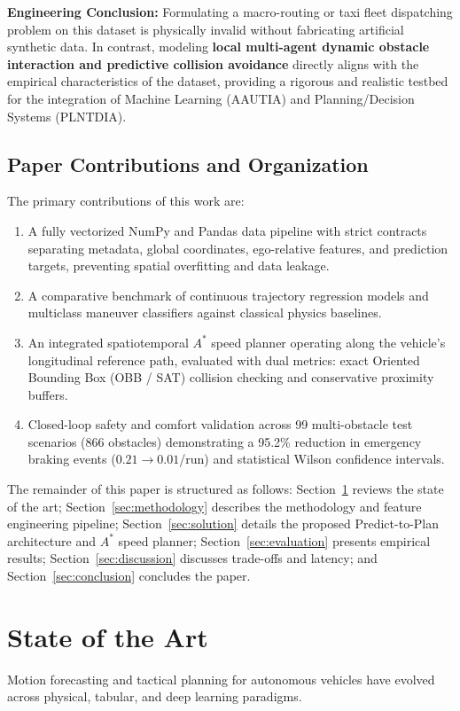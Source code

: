 \documentclass[runningheads]{llncs}
\begin{document}
\noindent \textbf{Engineering Conclusion:} Formulating a macro-routing or taxi fleet dispatching problem on this dataset is physically invalid without fabricating artificial synthetic data. In contrast, modeling \textbf{local multi-agent dynamic obstacle interaction and predictive collision avoidance} directly aligns with the empirical characteristics of the dataset, providing a rigorous and realistic testbed for the integration of Machine Learning (AAUTIA) and Planning/Decision Systems (PLNTDIA).

\subsection{Paper Contributions and Organization}
The primary contributions of this work are:
\begin{enumerate}
    \item A fully vectorized NumPy and Pandas data pipeline with strict contracts separating metadata, global coordinates, ego-relative features, and prediction targets, preventing spatial overfitting and data leakage.
    \item A comparative benchmark of continuous trajectory regression models and multiclass maneuver classifiers against classical physics baselines.
    \item An integrated spatiotemporal $A^*$ speed planner operating along the vehicle's longitudinal reference path, evaluated with dual metrics: exact Oriented Bounding Box (OBB / SAT) collision checking and conservative proximity buffers.
    \item Closed-loop safety and comfort validation across 99 multi-obstacle test scenarios (866 obstacles) demonstrating a 95.2\% reduction in emergency braking events ($0.21 \to 0.01$/run) and statistical Wilson confidence intervals.
\end{enumerate}

The remainder of this paper is structured as follows: Section~\ref{sec:sota} reviews the state of the art; Section~\ref{sec:methodology} describes the methodology and feature engineering pipeline; Section~\ref{sec:solution} details the proposed Predict-to-Plan architecture and $A^*$ speed planner; Section~\ref{sec:evaluation} presents empirical results; Section~\ref{sec:discussion} discusses trade-offs and latency; and Section~\ref{sec:conclusion} concludes the paper.

%
%
%
\section{State of the Art}
\label{sec:sota}
Motion forecasting and tactical planning for autonomous vehicles have evolved across physical, tabular, and deep learning paradigms.
\end{document}
